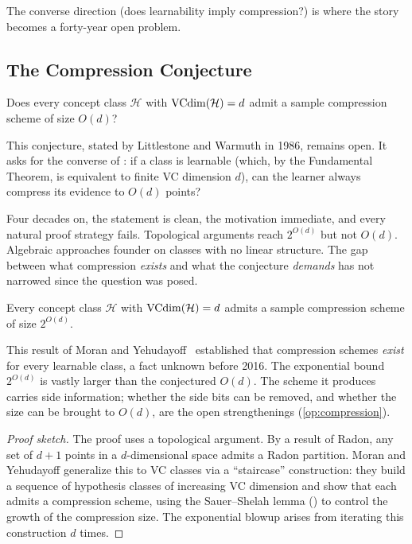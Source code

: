 The converse direction (does learnability imply compression?) is where the
story becomes a forty-year open problem.

\subsection{The Compression Conjecture}

\begin{openprob}
\label{op:compression}
Does every concept class $\mathcal{H}$ with $\mathrm{VCdim}(\mathcal{H}) = d$ admit a
sample compression scheme of size $O(d)$?
\end{openprob}

This conjecture, stated by Littlestone and Warmuth in 1986, remains open.  It
asks for the converse of : if a class is learnable
(which, by the Fundamental Theorem, is equivalent to finite VC dimension $d$),
can the learner always compress its evidence to $O(d)$ points?

Four decades on, the statement is clean, the motivation immediate, and every
natural proof strategy fails.  Topological arguments reach $2^{O(d)}$ but not
$O(d)$.  Algebraic approaches founder on classes with no linear structure.  The
gap between what compression \emph{exists} and what the conjecture \emph{demands}
has not narrowed since the question was posed.

\begin{thm}
\label{thm:moran-yehudayoff}
Every concept class $\mathcal{H}$ with $\mathrm{VCdim}(\mathcal{H}) = d$ admits a sample
compression scheme of size $2^{O(d)}$.
\end{thm}

This result of Moran and Yehudayoff~\cite{MoranYehudayoff2016}
established that compression schemes \emph{exist} for every learnable class, a
fact unknown before 2016.  The exponential bound $2^{O(d)}$ is vastly larger
than the conjectured $O(d)$.  The scheme it produces carries side information;
whether the side bits can be removed, and whether the size can be brought to
$O(d)$, are the open strengthenings (\cref{op:compression}).

\begin{proof}[Proof sketch]
The proof uses a topological argument.  By a result of
Radon, any set of $d+1$ points in a $d$-dimensional space admits a Radon
partition.  Moran and Yehudayoff generalize this to VC classes via a
``staircase'' construction: they build a sequence of hypothesis classes of
increasing VC dimension and show that each admits a compression scheme, using
the Sauer--Shelah lemma () to control the growth of
the compression size.  The exponential blowup arises from iterating this
construction $d$ times.
\end{proof}

